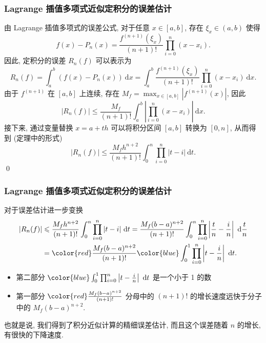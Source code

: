 
\begin{frame}
\frametitle{Lagrange 插值多项式近似定积分的误差估计}

\startproof[bg=yellow, fg=red]
由 Lagrange 插值多项式的误差公式, 对于任意 $x \in [a, b]$, 存在 $\xi_x \in (a, b)$ 使得
\[
f(x) - P_n(x) = \frac{f^{(n+1)}(\xi_x)}{(n+1)!} \prod_{i=0}^n (x - x_i).
\]
因此, 定积分的误差 $R_n(f)$ 可以表示为
\[
R_n(f) = \int_a^b (f(x) - P_n(x)) ~ \mathrm{d}x = \int_a^b \frac{f^{(n+1)}(\xi_x)}{(n+1)!} \prod_{i=0}^n (x - x_i) ~ \mathrm{d}x.
\]
由于 $f^{(n+1)}$ 在 $[a, b]$ 上连续, 存在 $M_f = \max_{x \in [a, b]} |f^{(n+1)}(x)|$, 因此
\[
|R_n(f)| \leqslant \frac{M_f}{(n+1)!} \int_a^b \left| \prod_{i=0}^n (x - x_i) \right| ~ \mathrm{d}x.
\]
接下来, 通过变量替换 $x = a + t h$ 可以将积分区间 $[a, b]$ 转换为 $[0, n]$, 从而得到 (定理中的形式)
\[
|R_n(f)| \leqslant \frac{M_f h^{n+2}}{(n+1)!} \int_0^n \prod_{i=0}^n |t - i| ~ \mathrm{d}t.
\]
\qed

\end{frame}


\begin{frame}
\frametitle{Lagrange 插值多项式近似定积分的误差估计}

对于误差估计进一步变换
\begin{align*}
|R_n(f)| & \leqslant \frac{M_f h^{n+2}}{(n+1)!} \int_0^n \prod_{i=0}^n |t - i| ~ \mathrm{d}t = \frac{M_f (b-a)^{n+2}}{(n+1)!} \int_0^n \prod_{i=0}^n \left|\frac{t}{n} - \frac{i}{n}\right| ~ \mathrm{d} \frac{t}{n} \\
& = {\color{red}\frac{M_f (b-a)^{n+2}}{(n+1)!}} {\color{blue}\int_0^1 \prod_{i=0}^n \left|t - \frac{i}{n}\right| ~ \mathrm{d}t}.
\end{align*}
\begin{itemize}
\item 第二部分 ${\color{blue}\int_0^1 \prod_{i=0}^n \left|t - \frac{i}{n}\right| ~ \mathrm{d}t}$ 是一个小于 1 的数
\item 第一部分 ${\color{red}\frac{M_f (b-a)^{n+2}}{(n+1)!}}$ 分母中的 $(n+1)!$ 的增长速度远快于分子中的 $M_f (b-a)^{n+2}$.
\end{itemize}
也就是说, 我们得到了积分近似计算的精细误差估计, 而且这个误差随着 $n$ 的增长, 有很快的下降速度.

\end{frame}


